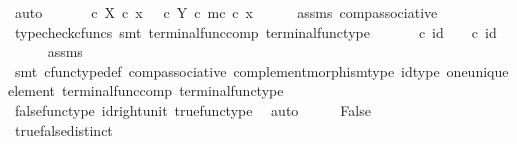 \begin{isabellebody}
\ auto\isanewline
\ \ \isamarkupfalse%
\ \isamarkupfalse%
\ {\isachardoublequoteopen}{\isasymt}\ {\isasymcirc}\isactrlsub c\ {\isasymbeta}\isactrlbsub X\isactrlesub \ {\isasymcirc}\isactrlsub c\ x\ {\isacharequal}{\kern0pt}\ {\isasymf}\ {\isasymcirc}\isactrlsub c\ {\isasymbeta}\isactrlbsub Y\isactrlesub \ {\isasymcirc}\isactrlsub c\ m\isactrlsup c\ {\isasymcirc}\isactrlsub c\ x{\isacharprime}{\kern0pt}{\isachardoublequoteclose}\isanewline
\ \ \ \ \isamarkupfalse%
\ assms\ comp{\isacharunderscore}{\kern0pt}associative{}\ \isamarkupfalse%
\ {\isacharparenleft}{\kern0pt}typecheck{\isacharunderscore}{\kern0pt}cfuncs{\isacharcomma}{\kern0pt}\ smt\ terminal{\isacharunderscore}{\kern0pt}func{\isacharunderscore}{\kern0pt}comp\ terminal{\isacharunderscore}{\kern0pt}func{\isacharunderscore}{\kern0pt}type{\isacharparenright}{\kern0pt}\isanewline
\ \ \isamarkupfalse%
\ \isamarkupfalse%
\ {\isachardoublequoteopen}{\isasymt}\ {\isasymcirc}\isactrlsub c\ id\ {\isasymone}\ {\isacharequal}{\kern0pt}\ {\isasymf}\ {\isasymcirc}\isactrlsub c\ id\ {\isasymone}{\isachardoublequoteclose}\isanewline
\ \ \ \ \isamarkupfalse%
\ assms\ \isamarkupfalse%
\ {\isacharparenleft}{\kern0pt}smt\ cfunc{\isacharunderscore}{\kern0pt}type{\isacharunderscore}{\kern0pt}def\ comp{\isacharunderscore}{\kern0pt}associative\ complement{\isacharunderscore}{\kern0pt}morphism{\isacharunderscore}{\kern0pt}type\ id{\isacharunderscore}{\kern0pt}type\ one{\isacharunderscore}{\kern0pt}unique{\isacharunderscore}{\kern0pt}element\ terminal{\isacharunderscore}{\kern0pt}func{\isacharunderscore}{\kern0pt}comp\ terminal{\isacharunderscore}{\kern0pt}func{\isacharunderscore}{\kern0pt}type{\isacharparenright}{\kern0pt}\isanewline
\ \ \isamarkupfalse%
\ \isamarkupfalse%
\ {\isachardoublequoteopen}{\isasymt}\ {\isacharequal}{\kern0pt}\ {\isasymf}{\isachardoublequoteclose}\isanewline
\ \ \ \ \isamarkupfalse%
\ false{\isacharunderscore}{\kern0pt}func{\isacharunderscore}{\kern0pt}type\ id{\isacharunderscore}{\kern0pt}right{\isacharunderscore}{\kern0pt}unit{}\ true{\isacharunderscore}{\kern0pt}func{\isacharunderscore}{\kern0pt}type\ \isamarkupfalse%
\ auto\isanewline
\ \ \isamarkupfalse%
\ \isamarkupfalse%
\ False\isanewline
\ \ \ \ \isamarkupfalse%
\ true{\isacharunderscore}{\kern0pt}false{\isacharunderscore}{\kern0pt}distinct\ \isamarkupfalse%

\end{isabellebody}
